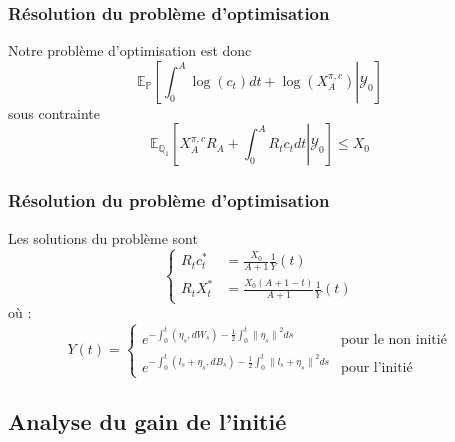 \documentclass{beamer}
\begin{document}
\begin{frame}
\frametitle{Résolution du problème d'optimisation}
Notre problème d'optimisation est donc 
\begin{equation*}
\mathbb{E}_{\mathbb{P}} \left[ \int_0^A \log  \left( c_t \right) dt + \log \left( X_A^{\pi, c}\right) \left\vert\right. \mathcal{Y}_0 \right]
\end{equation*}
sous contrainte 
\begin{equation*}
\mathbb{E}_{\mathbb{Q}_1} \left[ X_A^{\pi, c} R_A + \int_0^A R_t c_t dt \left\vert\right. \mathcal{Y}_0 \right] \leq X_0
\end{equation*}

\end{frame}

\begin{frame}
\frametitle{Résolution du problème d'optimisation}
Les solutions du problème sont 
\begin{equation*}
\begin{cases}
R_t c_t^* &= \frac{X_0}{A + 1} \frac{1}{Y} \left( t \right) \\
R_t X_t^* &= \frac{X_0 \left( A + 1 - t \right)}{A + 1} \frac{1}{Y} \left( t \right)
\end{cases}
\end{equation*}
où : 
\begin{displaymath}
Y \left( t \right) = 
\begin{cases}
e^{- \int_{0}^{t} \left( \eta_s, dW_{s} \right)-\frac{1}{2} \int_{0}^{t} {\| \eta_s \|}^{2} ds} & \text{pour le non initié} \\
e^{- \int_{0}^{t} \left( l_{s} + \eta_s, dB_{s} \right) - \frac{1}{2} \int_{0}^{t} {\| l_{s} + \eta_s \|}^{2} ds} & \text{pour l'initié}
\end{cases}
\end{displaymath}
\end{frame}
\subsection{Analyse du gain de l'initié}
\end{document}

